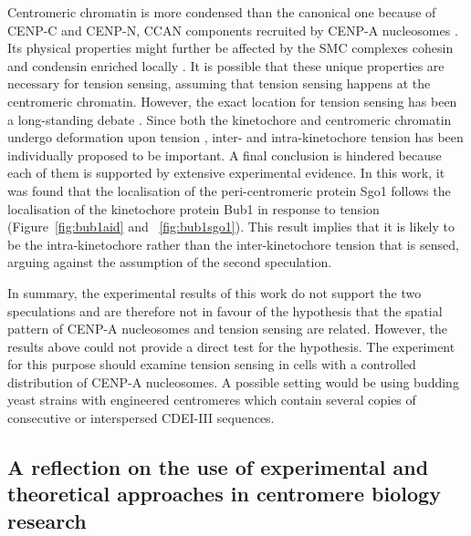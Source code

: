 Centromeric chromatin is more condensed than the canonical one because of CENP-C and CENP-N, CCAN components recruited by CENP-A nucleosomes \citep{Geiss2014, Panchenko2011, Zhou2022}. Its physical properties might further be affected by the SMC complexes cohesin and condensin enriched locally \citep{Verzijlbergen2014, Haase2012Bub1Dynamics, Paldi2020ConvergentPericentromeres}. It is possible that these unique properties are necessary for tension sensing, assuming that tension sensing happens at the centromeric chromatin. However, the exact location for tension sensing has been a long-standing debate \citep{McVey2021AuroraSegregation}. Since both the kinetochore and centromeric chromatin undergo deformation upon tension \citep{Goshima2000EstablishingYeast, Roscioli2020}, inter- and intra-kinetochore tension has been individually proposed to be important. A final conclusion is hindered because each of them is supported by extensive experimental evidence. In this work, it was found that the localisation of the peri-centromeric protein Sgo1 follows the localisation of the kinetochore protein Bub1 in response to tension (Figure~\ref{fig:bub1aid} and ~\ref{fig:bub1sgo1}). This result implies that it is likely to be the intra-kinetochore rather than the inter-kinetochore tension that is sensed, arguing against the assumption of the second speculation. 

In summary, the experimental results of this work do not support the two speculations and are therefore not in favour of the hypothesis that the spatial pattern of CENP-A nucleosomes and tension sensing are related. However, the results above could not provide a direct test for the hypothesis. The experiment for this purpose should examine tension sensing in cells with a controlled distribution of CENP-A nucleosomes. A possible setting would be using budding yeast strains with engineered centromeres which contain several copies of consecutive or interspersed CDEI-III sequences. 

\subsection{A reflection on the use of experimental and theoretical approaches in centromere biology research}

